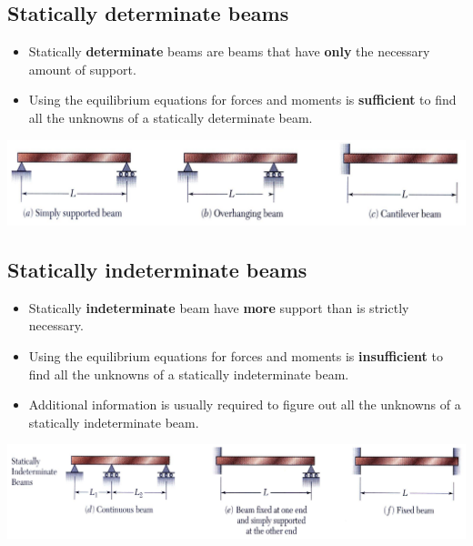 \documentclass[11pt]{article}
\begin{document}
\subsection{Statically determinate beams}
\label{sec:org522fcad}
\begin{itemize}
\item Statically \textbf{determinate} beams are beams that have \textbf{only} the necessary amount of support.
\item Using the equilibrium equations for forces and moments is \textbf{sufficient} to find all the unknowns of a statically determinate beam.
\end{itemize}

\begin{center}
\includegraphics[width=.9\linewidth]{./images/statically-determinate-beams.png}
\end{center}

\subsection{Statically indeterminate beams}
\label{sec:org1c14a82}
\begin{itemize}
\item Statically \textbf{indeterminate} beam have \textbf{more} support than is strictly necessary.
\item Using the equilibrium equations for forces and moments is \textbf{insufficient} to find all the unknowns of a statically indeterminate beam.
\item Additional information is usually required to figure out all the unknowns of a statically indeterminate beam.
\end{itemize}

\begin{center}
\includegraphics[width=.9\linewidth]{./images/statically-indeterminate-beams.png}
\end{center}

\newpage
\end{document}
